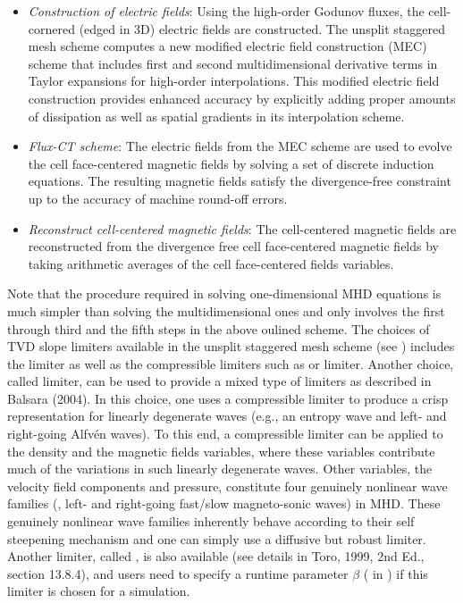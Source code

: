 \begin{itemize}
\item {\itshape Construction of electric fields}:
Using the high-order Godunov fluxes, the cell-cornered (edged in 3D) electric fields are constructed.
The unsplit staggered mesh scheme computes a new modified electric field construction (MEC) scheme that includes 
first and second multidimensional derivative terms in Taylor expansions for high-order interpolations. 
This modified electric field construction provides enhanced accuracy by explicitly adding proper 
amounts of dissipation as well as spatial gradients in its interpolation scheme. 

\item {\itshape Flux-CT scheme}:
The electric fields from the MEC scheme are used to evolve the cell face-centered magnetic fields 
by solving a set of discrete induction equations. 
The resulting magnetic fields satisfy the divergence-free constraint up to the accuracy of machine round-off errors.

\item {\itshape Reconstruct cell-centered magnetic fields}:
The cell-centered magnetic fields are reconstructed from the divergence free cell face-centered magnetic 
fields by taking arithmetic averages of the cell face-centered fields variables. 
\end{itemize}


Note that the procedure required in solving one-\-dimensional MHD equations is much
simpler than solving the multidimensional ones and only involves
the first through third and the fifth steps in the above oulined scheme.
The choices of TVD slope limiters available in the unsplit staggered mesh scheme (see
) includes the 
limiter as well as the compressible limiters
such as  or  limiter. Another choice, called
 limiter, can be used to provide a mixed type of limiters as described
in Balsara (2004). In this choice, one uses a compressible limiter
to produce a crisp representation for linearly
degenerate waves (e.g., an entropy wave and
left- and right-going Alfv\'{e}n waves).
To this end, a compressible limiter can be applied
to the density and the magnetic fields variables,
where these variables contribute much of the
variations in such linearly degenerate waves.
Other variables, the velocity field
components and pressure, constitute four genuinely nonlinear
wave families (\ie, left- and right-going fast/slow magneto-sonic waves)
in MHD. These genuinely nonlinear wave families inherently
behave according to their self steepening mechanism and one
can simply use a diffusive but robust  limiter.
Another limiter, called , is also available (see details in
Toro, 1999, 2nd Ed., section 13.8.4), and users need to specify a runtime parameter
$\beta$ ( in ) if this limiter is chosen for a simulation.

